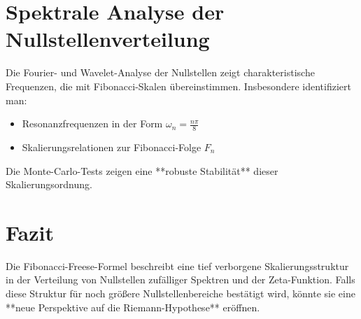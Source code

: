 \documentclass[a4paper,12pt]{article}
\begin{document}
\section{Spektrale Analyse der Nullstellenverteilung}
Die Fourier- und Wavelet-Analyse der Nullstellen zeigt charakteristische Frequenzen, die mit Fibonacci-Skalen übereinstimmen. Insbesondere identifiziert man:
\begin{itemize}
    \item Resonanzfrequenzen in der Form \( \omega_n = \frac{n \pi}{8} \)
    \item Skalierungsrelationen zur Fibonacci-Folge \( F_n \)
\end{itemize}
Die Monte-Carlo-Tests zeigen eine **robuste Stabilität** dieser Skalierungsordnung.

\section{Fazit}
Die Fibonacci-Freese-Formel beschreibt eine tief verborgene Skalierungsstruktur in der Verteilung von Nullstellen zufälliger Spektren und der Zeta-Funktion. Falls diese Struktur für noch größere Nullstellenbereiche bestätigt wird, könnte sie eine **neue Perspektive auf die Riemann-Hypothese** eröffnen.
\end{document}
